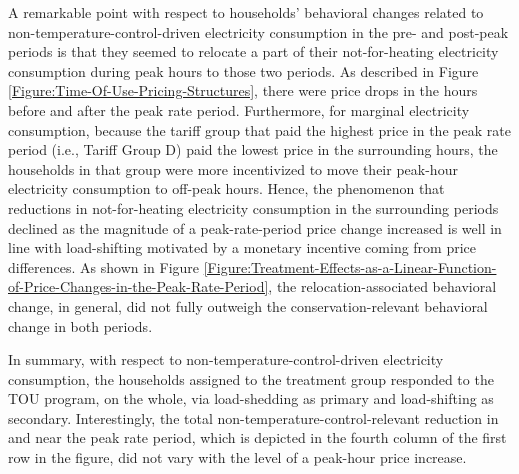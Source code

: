 A remarkable point with respect to households' behavioral changes related to non-temperature-control-driven electricity consumption in the pre- and post-peak periods is that they seemed to relocate a part of their not-for-heating electricity consumption during peak hours to those two periods. As described in Figure \ref{Figure:Time-Of-Use-Pricing-Structures}, there were price drops in the hours before and after the peak rate period. Furthermore, for marginal electricity consumption, because the tariff group that paid the highest price in the peak rate period (i.e., Tariff Group D) paid the lowest price in the surrounding hours, the households in that group were more incentivized to move their peak-hour electricity consumption to off-peak hours. Hence, the phenomenon that reductions in not-for-heating electricity consumption in the surrounding periods declined as the magnitude of a peak-rate-period price change increased is well in line with load-shifting motivated by a monetary incentive coming from price differences. As shown in Figure \ref{Figure:Treatment-Effects-as-a-Linear-Function-of-Price-Changes-in-the-Peak-Rate-Period}, the relocation-associated behavioral change, in general, did not fully outweigh the conservation-relevant behavioral change in both periods. 

In summary, with respect to non-temperature-control-driven electricity consumption, the households assigned to the treatment group responded to the TOU program, on the whole, via load-shedding as primary and load-shifting as secondary. Interestingly, the total non-temperature-control-relevant reduction in and near the peak rate period, which is depicted in the fourth column of the first row in the figure, did not vary with the level of a peak-hour price increase. 

